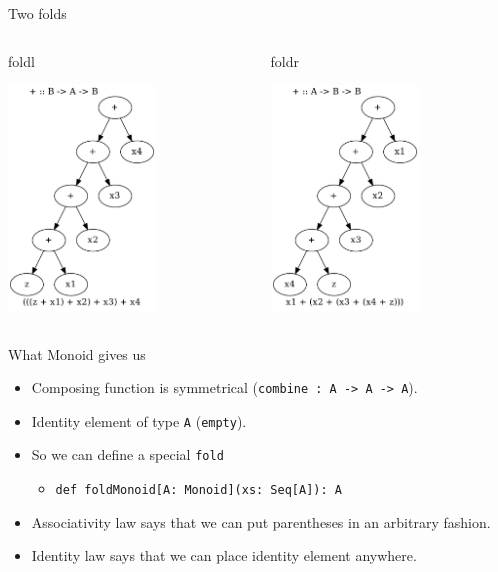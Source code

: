 \documentclass[presentation,aspectratio=169,smaller]{beamer}
\begin{document}
\begin{frame}[label={sec:org8fc2190}]{Two folds}
\begin{columns}
\begin{column}[t]{0.5\columnwidth}
\begin{block}{foldl}
\begin{center}
\includegraphics[height=6cm]{.dot/foldl-1.png}
\end{center}
\end{block}
\end{column}

\begin{column}[t]{0.5\columnwidth}
\begin{block}{foldr}
\begin{center}
\includegraphics[height=6cm]{.dot/foldr-1.png}
\end{center}
\end{block}
\end{column}
\end{columns}
\end{frame}

\begin{frame}[label={sec:orged67ed8},fragile]{What Monoid gives us}
 \begin{itemize}
\item <1-> Composing function is symmetrical (\texttt{combine : A -> A -> A}).
\item <2-> Identity element of type \texttt{A} (\texttt{empty}).
\item <3-> So we can define a special \texttt{fold}
\begin{itemize}
\item \texttt{def foldMonoid[A: Monoid](xs: Seq[A]): A}
\end{itemize}
\item <4-> Associativity law says that we can put parentheses in an arbitrary fashion.
\item <5-> Identity law says that we can place identity element anywhere.
\end{itemize}
\end{frame}
\end{document}
